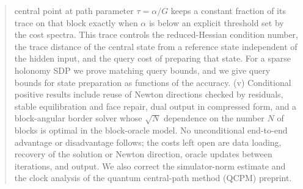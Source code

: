 \documentclass[11pt]{article}
\theoremstyle{plain}
\theoremstyle{definition}
\theoremstyle{remark}
\begin{document}
\begin{abstract}
central point at path parameter \(\tau=\alpha/G\) keeps a constant fraction of
its trace on that block exactly when \(\alpha\) is below an explicit
threshold set by the cost spectra.  This trace controls the reduced-Hessian
condition number, the trace distance of the central state from a reference
state independent of the hidden input, and the query cost of preparing that state.
For a sparse holonomy SDP we prove matching query bounds, and we give query
bounds for state preparation as functions of the accuracy.
(v) Conditional positive results include reuse of Newton directions checked
by residuals, stable equilibration and face repair, dual output in
compressed form, and a block-angular border solver whose \(\sqrt N\)
dependence on the number \(N\) of blocks is optimal in the block-oracle
model.
No unconditional end-to-end advantage or disadvantage follows; the costs
left open are data loading, recovery of the solution or Newton direction,
oracle updates between iterations, and output.  We also correct the
simulator-norm estimate and the clock analysis of the quantum central-path
method (QCPM) preprint.
\end{abstract}

\tableofcontents




















\end{document}
